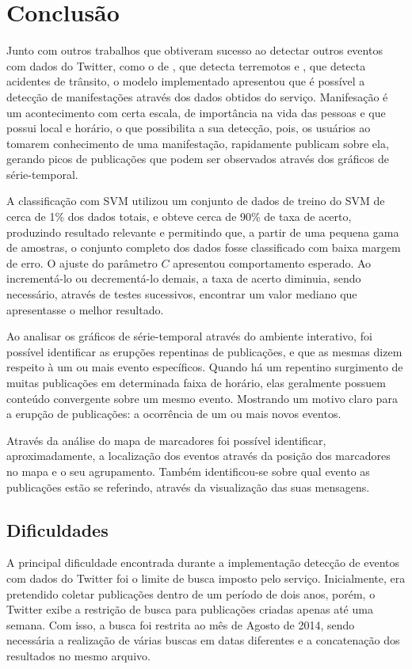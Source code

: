 \chapter{Conclusão}

Junto com outros trabalhos que obtiveram sucesso ao detectar outros eventos com dados do Twitter, como o de , que detecta terremotos e , que detecta acidentes de trânsito, o modelo implementado apresentou que é possível a detecção de manifestações através dos dados obtidos do serviço. Manifesação é um acontecimento com certa escala, de importância na vida das pessoas e que possui local e horário, o que possibilita a sua detecção, pois, os usuários ao tomarem conhecimento de uma manifestação, rapidamente publicam sobre ela, gerando picos de publicações que podem ser observados através dos gráficos de série-temporal.

A classificação com SVM utilizou um conjunto de dados de treino do SVM de cerca de 1\% dos dados totais, e obteve cerca de 90\% de taxa de acerto, produzindo resultado relevante e permitindo que, a partir de uma pequena gama de amostras, o conjunto completo dos dados fosse classificado com baixa margem de erro. O ajuste do parâmetro $C$ apresentou comportamento esperado. Ao incrementá-lo ou decrementá-lo demais, a taxa de acerto diminuia, sendo necessário, através de testes sucessivos, encontrar um valor mediano que apresentasse o melhor resultado.

Ao analisar os gráficos de série-temporal através do ambiente interativo, foi possível identificar as erupções repentinas de publicações, e que as mesmas dizem respeito à um ou mais evento específicos. Quando há um repentino surgimento de muitas publicações em determinada faixa de horário, elas geralmente possuem conteúdo convergente sobre um mesmo evento. Mostrando um motivo claro para a erupção de publicações: a ocorrência de um ou mais novos eventos.

Através da análise do mapa de marcadores foi possível identificar, aproximadamente, a localização dos eventos através da posição dos marcadores no mapa e o seu agrupamento. Também identificou-se sobre qual evento as publicações estão se referindo, através da visualização das suas mensagens.

\section{Dificuldades}

A principal dificuldade encontrada durante a implementação detecção de eventos com dados do Twitter foi o limite de busca imposto pelo serviço. Inicialmente, era pretendido coletar publicações dentro de um período de dois anos, porém, o Twitter exibe a restrição de busca para publicações criadas apenas até uma semana. Com isso, a busca foi restrita ao mês de Agosto de 2014, sendo necessária a realização de várias buscas em datas diferentes e a concatenação dos resultados no mesmo arquivo.

